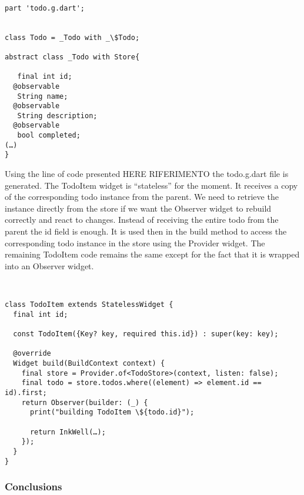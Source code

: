 \begin{code}
\mbox{}\\
 \mbox{}
		\label{code:2.14}
\begin{verbatim}
part 'todo.g.dart';


class Todo = _Todo with _\$Todo;

abstract class _Todo with Store{

   final int id;
  @observable
   String name;
  @observable
   String description;
  @observable
   bool completed;
(…)
}
\end{verbatim}
\mbox{}
\end{code}

Using the line of code presented HERE RIFERIMENTO the todo.g.dart file is generated. The TodoItem widget is “stateless” for the moment. It receives a copy of the corresponding todo instance from the parent. We need to retrieve the instance directly from the store if we want the Observer widget to rebuild correctly and react to changes. Instead of receiving the entire todo from the parent the id field is enough. It is used then in the build method to access the corresponding todo instance in the store using the Provider widget. The remaining TodoItem code remains the same except for the fact that it is wrapped into an Observer widget.
\begin{code}
\mbox{}\\
 \mbox{}
		\label{code:2.14}
\begin{verbatim}
class TodoItem extends StatelessWidget {
  final int id;

  const TodoItem({Key? key, required this.id}) : super(key: key);

  @override
  Widget build(BuildContext context) {
    final store = Provider.of<TodoStore>(context, listen: false);
    final todo = store.todos.where((element) => element.id == id).first;
    return Observer(builder: (_) {
      print("building TodoItem \${todo.id}");

      return InkWell(…);
    });
  }
}
\end{verbatim}
\mbox{}
\end{code}

\subsubsection{Conclusions} \mbox{}\\ \label{par:todo_app_inherited_widget_introduction}
